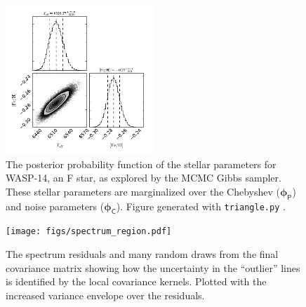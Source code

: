 \documentclass[iop,floatfix]{emulateapj}
\newcommand{\vp}{ {\bm \phi}}
\newcommand{\cheb}{ \vp_{\mathsf{P}}}
\newcommand{\cov}{ \vp_{\mathsf{C}}}
\newcommand{\todo}[1]{ \textcolor{blue}{\\TODO: #1}}
\begin{document}
\begin{figure}[!htb]
\begin{center}
  \includegraphics[width=0.5\textwidth]{figs/kurucz_triangle.pdf}
  \caption{The posterior probability function of the stellar parameters for WASP-14, an F star, as explored by the MCMC Gibbs sampler. These stellar parameters are marginalized over the Chebyshev ($\cheb$) and noise parameters ($\cov$). Figure generated with \texttt{triangle.py} \citep{foreman-mackey14}.
}
\label{fig:stellar_posterior}
\end{center}
\end{figure}


\begin{figure}[!htb]
\begin{center}
  \texttt{[image: figs/spectrum\_region.pdf]}
  \caption{The spectrum residuals and many random draws from the final covariance matrix showing how the uncertainty in the ``outlier'' lines is identified by the local covariance kernels. Plotted with the increased variance envelope over the residuals.
}
\label{fig:regions}
\end{center}
\end{figure}

\end{document}
